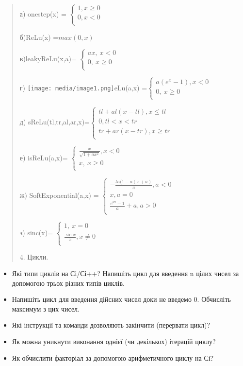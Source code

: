 \documentclass[]{article}
\begin{document}
\begin{quote}
а) onestep(x) = \(\left\{ \begin{matrix}
1,x \geq 0 \\
0,x < 0 \\
\end{matrix} \right.\ \)

б)ReLu(x) =\(max(0,x)\)

в)leakyReLu(x,a)= \(\left\{ \begin{matrix}
ax,\ x < 0 \\
0,\ x \geq 0 \\
\end{matrix} \right.\ \)

г) \texttt{[image: media/image1.png]}eLu(a,x) =\(\left\{ \begin{matrix}
a(e^{x} - 1),x < 0 \\
0,\ x \geq 0 \\
\end{matrix} \right.\ \)

д) sReLu(tl,tr,al,ar,x)=\(\left\{ \begin{matrix}
tl + al\left( x - tl \right),x \leq tl \\
0,tl < x < tr \\
tr + ar\left( x - tr \right),x \geq tr \\
\end{matrix} \right.\ \)

е) isReLu(a,x)= \(\left\{ \begin{matrix}
\frac{x}{\sqrt{1 + ax^{2}}},x < 0 \\
x,\ x \geq 0 \\
\end{matrix} \right.\ \)

ж) SoftExponential(a,x) = \(\left\{ \begin{matrix}
 - \frac{ln(1 - a(x + a)}{a},a < 0 \\
x,a = 0 \\
\frac{e^{\text{ax}} - 1}{a} + a,a > 0 \\
\end{matrix} \right.\ \)

з) sinc(x)= \(\left\{ \begin{matrix}
1,\ x = 0 \\
\frac{\sin x}{x},x \neq 0 \\
\end{matrix} \right.\ \)

4. Цикли.
\end{quote}

\begin{itemize}
\item
  Які типи циклів на Сі/Сі++? Напишіть цикл для введення n цілих чисел
  за допомогою трьох різних типів циклів.
\item
  Напишіть цикл для введення дійсних чисел доки не введемо 0. Обчисліть
  максимум з цих чисел.
\item
  Які інструкції та команди дозволяють закінчити (перервати цикл)?
\item
  Як можна уникнути виконання однієї (чи декількох) ітерацій циклу?
\item
  Як обчислити факторіал за допомогою арифметичного циклу на Сі?
\end{itemize}
\end{document}
